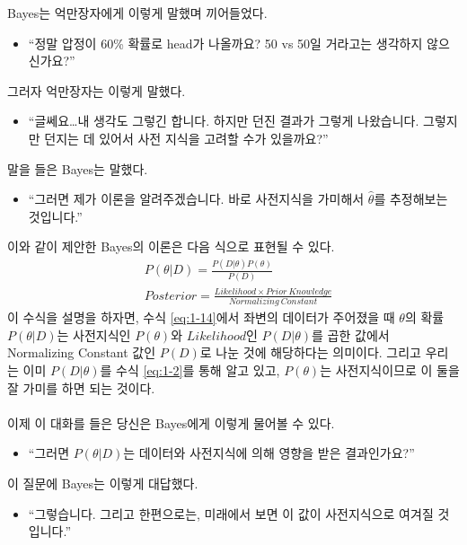 \documentclass[a4paper]{oblivoir}
\begin{document}
 Bayes는 억만장자에게 이렇게 말했며 끼어들었다.
\begin{itemize}
\item``정말 압정이 60\% 확률로 head가 나올까요? 50 vs 50일 거라고는 생각하지 않으신가요?''
\end{itemize}
그러자 억만장자는 이렇게 말했다.
\begin{itemize}
\item``글쎄요\ldots 내 생각도 그렇긴 합니다. 하지만 던진 결과가 그렇게 나왔습니다. 그렇지만 던지는 데 있어서 사전 지식을 고려할 수가 있을까요?''
\end{itemize}
말을 들은 Bayes는 말했다. 
\begin{itemize}
\item``그러면 제가 이론을 알려주겠습니다. 바로 사전지식을 가미해서 $\hat{\theta}$를 추정해보는 것입니다.''
\end{itemize}
이와 같이 제안한 Bayes의 이론은 다음 식으로 표현될 수 있다.
\begin{align}
&P(\theta| D)=\frac{P(D| \theta)P(\theta)}{P(D)}\label{eq:1-14}\\
&Posterior=\frac{Likelihood\times Prior\ Knowledge}{Normalizing\ Constant}\label{eq:1-15}
\end{align}
\indent 이 수식을 설명을 하자면, 수식 \eqref{eq:1-14}에서 좌변의 데이터가 주어졌을 때 $\theta$의 확률 $P(\theta| D)$는 사전지식인 $P(\theta)$와 $Likelihood$인 $P(D| \theta)$를 곱한 값에서 Normalizing Constant 값인 $P(D)$로 나눈 것에 해당하다는 의미이다.
그리고 우리는 이미 $P(D| \theta)$를 수식 \eqref{eq:1-2}를 통해 알고 있고, $P(\theta)$는 사전지식이므로 이 둘을 잘 가미를 하면 되는 것이다.\\\\
이제 이 대화를 들은 당신은 Bayes에게 이렇게 물어볼 수 있다.
\begin{itemize}
\item``그러면 $P(\theta|D)$는 데이터와 사전지식에 의해 영향을 받은 결과인가요?''
\end{itemize}
이 질문에 Bayes는 이렇게 대답했다.
\begin{itemize}
\item``그렇습니다. 그리고 한편으로는, 미래에서 보면 이 값이 사전지식으로 여겨질 것입니다.''
\end{itemize}
\end{document}
